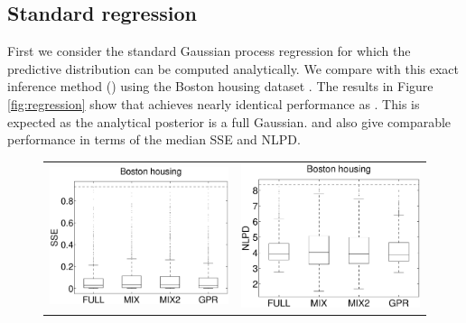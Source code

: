 \subsection{Standard regression}

%
First we consider the standard Gaussian process regression for 
which the predictive distribution can be computed analytically.
We compare with this exact inference method (\gpr) using the Boston housing dataset \cite{uci2013}.
The results in Figure \ref{fig:regression} show that \agpfull \space achieves nearly identical  performance as \gpr.
This is expected as the analytical posterior is a full Gaussian.
\agpmix \space and \agpmixtwo \space also give comparable performance in terms of the median SSE and NLPD. 
\begin{figure}
\centering
\begin{tabular}{cc}
\includegraphics[scale=0.2]{figures/housing-smse.eps} &
\includegraphics[scale=0.2]{figures/housing-nlpd.eps} \\

\end{tabular}
\end{figure}
